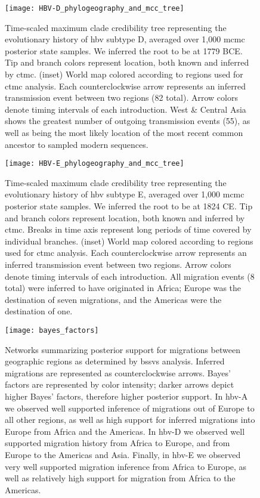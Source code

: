 \begin{figure}[ht]
  \centering
  \medskip
  \texttt{[image: HBV-D\_phylogeography\_and\_mcc\_tree]}
  \caption[HBV-D Phylogeography]{Time-scaled maximum clade credibility tree representing the evolutionary history of \gls{hbv} subtype D, averaged over 1,000 \gls{mcmc} posterior state samples. We inferred the root to be at 1779 BCE. Tip and branch colors represent location, both known and inferred by \gls{ctmc}. (inset) World map colored according to regions used for \gls{ctmc} analysis. Each counterclockwise arrow represents an inferred transmission event between two regions (82 total). Arrow colors denote timing intervals of each introduction. West \& Central Asia shows the greatest number of outgoing transmission events (55), as well as being the most likely location of the most recent common ancestor to sampled modern sequences.}
  \label{fig:HBV-D_phylogeo}
\end{figure}

\begin{figure}[ht]
  \centering
  \medskip
  \texttt{[image: HBV-E\_phylogeography\_and\_mcc\_tree]}
  \caption[HBV-E Phylogeography]{Time-scaled maximum clade credibility tree representing the evolutionary history of \gls{hbv} subtype E, averaged over 1,000 \gls{mcmc} posterior state samples. We inferred the root to be at 1824 CE. Tip and branch colors represent location, both known and inferred by \gls{ctmc}. Breaks in time axis represent long periods of time covered by individual branches. (inset) World map colored according to regions used for \gls{ctmc} analysis. Each counterclockwise arrow represents an inferred transmission event between two regions. Arrow colors denote timing intervals of each introduction. All migration events (8 total) were inferred to have originated in Africa; Europe was the destination of seven migrations, and the Americas were the destination of one.}
  \label{fig:HBV-E_phylogeo}
\end{figure}

\begin{figure}[ht]
  \centering
  \medskip
  \texttt{[image: bayes\_factors]}
  \caption[Bayes' factors of \gls{hbv} geographic transitions]{Networks summarizing posterior support for migrations between geographic regions as determined by \gls{bssvs} analysis. Inferred migrations are represented as counterclockwise arrows. Bayes' factors are represented by color intensity; darker arrows depict higher Bayes' factors, therefore higher posterior support. In \gls{hbv}-A we observed well supported inference of migrations out of Europe to all other regions, as well as high support for inferred migrations into Europe from Africa and the Americas. In \gls{hbv}-D we observed well supported migration history from Africa to Europe, and from Europe to the Americas and Asia. Finally, in \gls{hbv}-E we observed very well supported migration inference from Africa to Europe, as well as relatively high support for migration from Africa to the Americas.}
  \label{fig:bayes_factors}
\end{figure}


